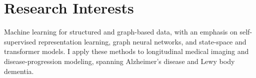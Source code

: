 \documentclass[11pt]{article}
\begin{document}


\section{Research Interests}
Machine learning for structured and graph-based data, with an emphasis on self-supervised
representation learning, graph neural networks, and state-space and transformer models.
I apply these methods to longitudinal medical imaging and disease-progression modeling,
spanning Alzheimer's disease and Lewy body dementia.









\end{document}
